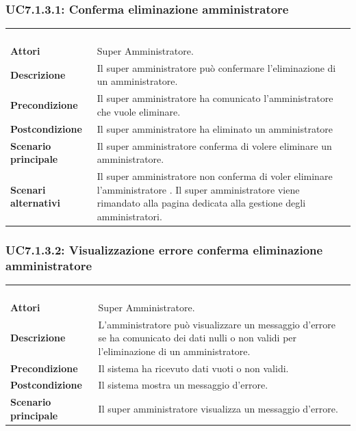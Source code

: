 \subsubsection{UC7.1.3.1: Conferma eliminazione amministratore}
\label{UC7.1.3.1}
\begin{longtable}{l|p{10cm}}
\rowcolor[gray]{0.8} \multicolumn{2}{c}{} \\
\rowcolor[gray]{0.8} \multicolumn{2}{c}{\textbf{UC7.1.3.1 - Conferma eliminazione amministratore}} \\
\rowcolor[gray]{0.8} \multicolumn{2}{c}{} \\
\hline
&\\
\textbf{Attori} & Super Amministratore.\\[7pt]
\textbf{Descrizione} & Il super amministratore può confermare l'eliminazione di un amministratore.\\[7pt]
\textbf{Precondizione} & Il super amministratore ha comunicato l'amministratore che vuole eliminare.\\[7pt]
\textbf{Postcondizione} & Il super amministratore ha eliminato un amministratore\\[7pt]
\textbf{Scenario principale} &Il super amministratore conferma di volere eliminare un amministratore.\\[7pt]
\textbf{Scenari alternativi} & Il super amministratore non conferma di voler eliminare l'amministratore . Il super amministratore viene rimandato alla pagina dedicata alla gestione degli amministratori.\\[7pt]\hline
\end{longtable}

\subsubsection{UC7.1.3.2: Visualizzazione errore conferma eliminazione amministratore}
\label{UC7.1.3.2}
\begin{longtable}{l|p{10cm}}
\rowcolor[gray]{0.8} \multicolumn{2}{c}{} \\
\rowcolor[gray]{0.8} \multicolumn{2}{c}{\textbf{UC7.1.3.2 - Visualizzazione errore conferma eliminazione amministratore}} \\
\rowcolor[gray]{0.8} \multicolumn{2}{c}{} \\
\hline
&\\
\textbf{Attori} & Super Amministratore.\\[7pt]
\textbf{Descrizione} & L'amministratore può visualizzare un messaggio d'errore se ha comunicato dei dati nulli o non validi per l'eliminazione di un amministratore.\\[7pt]
\textbf{Precondizione} & Il sistema ha ricevuto dati vuoti o non validi.\\[7pt]
\textbf{Postcondizione} & Il sistema mostra un messaggio d'errore.\\[7pt]
\textbf{Scenario principale} &Il super amministratore visualizza un messaggio d'errore.\\[7pt]\hline
\end{longtable}

